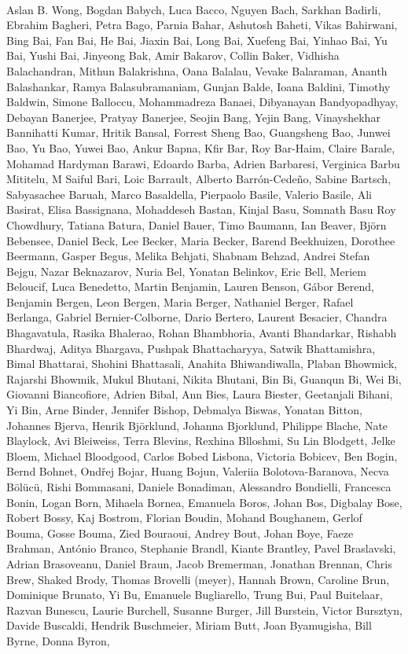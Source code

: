\paragraph{}Aslan B. Wong, Bogdan Babych, Luca Bacco, Nguyen Bach, Sarkhan Badirli, Ebrahim Bagheri, Petra Bago, Parnia Bahar, Ashutosh Baheti, Vikas Bahirwani, Bing Bai, Fan Bai, He Bai, Jiaxin Bai, Long Bai, Xuefeng Bai, Yinhao Bai, Yu Bai, Yushi Bai, Jinyeong Bak, Amir Bakarov, Collin Baker, Vidhisha Balachandran, Mithun Balakrishna, Oana Balalau, Vevake Balaraman, Ananth Balashankar, Ramya Balasubramaniam, Gunjan Balde, Ioana Baldini, Timothy Baldwin, Simone Balloccu, Mohammadreza Banaei, Dibyanayan Bandyopadhyay, Debayan Banerjee, Pratyay Banerjee, Seojin Bang, Yejin Bang, Vinayshekhar Bannihatti Kumar, Hritik Bansal, Forrest Sheng Bao, Guangsheng Bao, Junwei Bao, Yu Bao, Yuwei Bao, Ankur Bapna, Kfir Bar, Roy Bar-Haim, Claire Barale, Mohamad Hardyman Barawi, Edoardo Barba, Adrien Barbaresi, Verginica Barbu Mititelu, M Saiful Bari, Loic Barrault, Alberto Barrón-Cedeño, Sabine Bartsch, Sabyasachee Baruah, Marco Basaldella, Pierpaolo Basile, Valerio Basile, Ali Basirat, Elisa Bassignana, Mohaddeseh Bastan, Kinjal Basu, Somnath Basu Roy Chowdhury, Tatiana Batura, Daniel Bauer, Timo Baumann, Ian Beaver, Björn Bebensee, Daniel Beck, Lee Becker, Maria Becker, Barend Beekhuizen, Dorothee Beermann, Gasper Begus, Melika Behjati, Shabnam Behzad, Andrei Stefan Bejgu, Nazar Beknazarov, Nuria Bel, Yonatan Belinkov, Eric Bell, Meriem Beloucif, Luca Benedetto, Martin Benjamin, Lauren Benson, Gábor Berend, Benjamin Bergen, Leon Bergen, Maria Berger, Nathaniel Berger, Rafael Berlanga, Gabriel Bernier-Colborne, Dario Bertero, Laurent Besacier, Chandra Bhagavatula, Rasika Bhalerao, Rohan Bhambhoria, Avanti Bhandarkar, Rishabh Bhardwaj, Aditya Bhargava, Pushpak Bhattacharyya, Satwik Bhattamishra, Bimal Bhattarai, Shohini Bhattasali, Anahita Bhiwandiwalla, Plaban Bhowmick, Rajarshi Bhowmik, Mukul Bhutani, Nikita Bhutani, Bin Bi, Guanqun Bi, Wei Bi, Giovanni Biancofiore, Adrien Bibal, Ann Bies, Laura Biester, Geetanjali Bihani, Yi Bin, Arne Binder, Jennifer Bishop, Debmalya Biswas, Yonatan Bitton, Johannes Bjerva, Henrik Björklund, Johanna Bjorklund, Philippe Blache, Nate Blaylock, Avi Bleiweiss, Terra Blevins, Rexhina Blloshmi, Su Lin Blodgett, Jelke Bloem, Michael Bloodgood, Carlos Bobed Lisbona, Victoria Bobicev, Ben Bogin, Bernd Bohnet, Ondřej Bojar, Huang Bojun, Valeriia Bolotova-Baranova, Necva Bölücü, Rishi Bommasani, Daniele Bonadiman, Alessandro Bondielli, Francesca Bonin, Logan Born, Mihaela Bornea, Emanuela Boros, Johan Bos, Digbalay Bose, Robert Bossy, Kaj Bostrom, Florian Boudin, Mohand Boughanem, Gerlof Bouma, Gosse Bouma, Zied Bouraoui, Andrey Bout, Johan Boye, Faeze Brahman, António Branco, Stephanie Brandl, Kiante Brantley, Pavel Braslavski, Adrian Brasoveanu, Daniel Braun, Jacob Bremerman, Jonathan Brennan, Chris Brew, Shaked Brody, Thomas Brovelli (meyer), Hannah Brown, Caroline Brun, Dominique Brunato, Yi Bu, Emanuele Bugliarello, Trung Bui, Paul Buitelaar, Razvan Bunescu, Laurie Burchell, Susanne Burger, Jill Burstein, Victor Bursztyn, Davide Buscaldi, Hendrik Buschmeier, Miriam Butt, Joan Byamugisha, Bill Byrne, Donna Byron,
